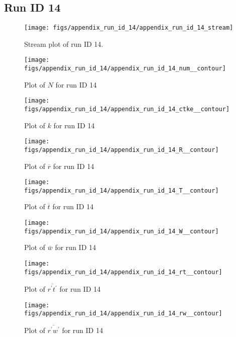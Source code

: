 \subsection{Run ID 14}
\begin{figure}[H]
\centering
\texttt{[image: figs/appendix\_run\_id\_14/appendix\_run\_id\_14\_stream]}
\caption{Stream plot of run ID 14.}
\label{fig:appendix_run_id_14_stream}
\end{figure}


\begin{figure}[H]
\centering
\texttt{[image: figs/appendix\_run\_id\_14/appendix\_run\_id\_14\_num\_\_contour]}
\caption{Plot of $N$ for run ID 14}
\label{fig:appendix_run_id_14_num__contour}
\end{figure}


\begin{figure}[H]
\centering
\texttt{[image: figs/appendix\_run\_id\_14/appendix\_run\_id\_14\_ctke\_\_contour]}
\caption{Plot of $k$ for run ID 14}
\label{fig:appendix_run_id_14_ctke__contour}
\end{figure}


\begin{figure}[H]
\centering
\texttt{[image: figs/appendix\_run\_id\_14/appendix\_run\_id\_14\_R\_\_contour]}
\caption{Plot of $\overline{r}$ for run ID 14}
\label{fig:appendix_run_id_14_R__contour}
\end{figure}


\begin{figure}[H]
\centering
\texttt{[image: figs/appendix\_run\_id\_14/appendix\_run\_id\_14\_T\_\_contour]}
\caption{Plot of $\overline{t}$ for run ID 14}
\label{fig:appendix_run_id_14_T__contour}
\end{figure}


\begin{figure}[H]
\centering
\texttt{[image: figs/appendix\_run\_id\_14/appendix\_run\_id\_14\_W\_\_contour]}
\caption{Plot of $\overline{w}$ for run ID 14}
\label{fig:appendix_run_id_14_W__contour}
\end{figure}


\begin{figure}[H]
\centering
\texttt{[image: figs/appendix\_run\_id\_14/appendix\_run\_id\_14\_rt\_\_contour]}
\caption{Plot of $\overline{r^\prime t^\prime}$ for run ID 14}
\label{fig:appendix_run_id_14_rt__contour}
\end{figure}


\begin{figure}[H]
\centering
\texttt{[image: figs/appendix\_run\_id\_14/appendix\_run\_id\_14\_rw\_\_contour]}
\caption{Plot of $\overline{r^\prime w^\prime}$ for run ID 14}
\label{fig:appendix_run_id_14_rw__contour}
\end{figure}


